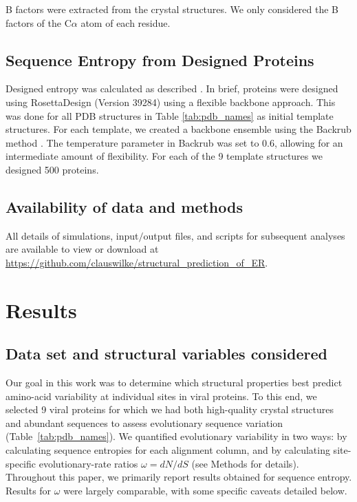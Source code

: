 \documentclass[smallextended]{svjour3}
\begin{document}
B factors were extracted from the crystal structures. We only considered the B factors of the C$\alpha$ atom of each residue.


\subsection*{Sequence Entropy from Designed Proteins}

Designed entropy was calculated as described \citep{Jacksonetal2013}. In brief, proteins were designed using RosettaDesign (Version 39284) \citep{LeaverFayetal2011} using a flexible backbone approach. This was done for all PDB structures in Table \ref{tab:pdb_names} as initial template structures. For each template, we created a backbone ensemble using the Backrub method \citep{Smith2008}. The temperature parameter in Backrub was set to 0.6, allowing for an intermediate amount of flexibility.  For each of the 9 template structures we designed 500 proteins.

\subsection*{Availability of data and methods}

All details of simulations, input$/$output files, and scripts for subsequent analyses are available to view or download at \url{https://github.com/clauswilke/structural\_prediction\_of\_ER}.

\section*{Results}

\subsection*{Data set and structural variables considered}

Our goal in this work was to determine which structural properties best predict amino-acid variability at individual sites in viral proteins. To this end, we selected 9 viral proteins for which we had both high-quality crystal structures and abundant sequences to assess evolutionary sequence variation (Table~\ref{tab:pdb_names}). We quantified evolutionary variability in two ways: by calculating sequence entropies for each alignment column, and by calculating site-specific evolutionary-rate ratios $\omega=dN/dS$ (see Methods for details). Throughout this paper, we primarily report results obtained for sequence entropy. Results for $\omega$ were largely comparable, with some specific caveats detailed below.
\end{document}
